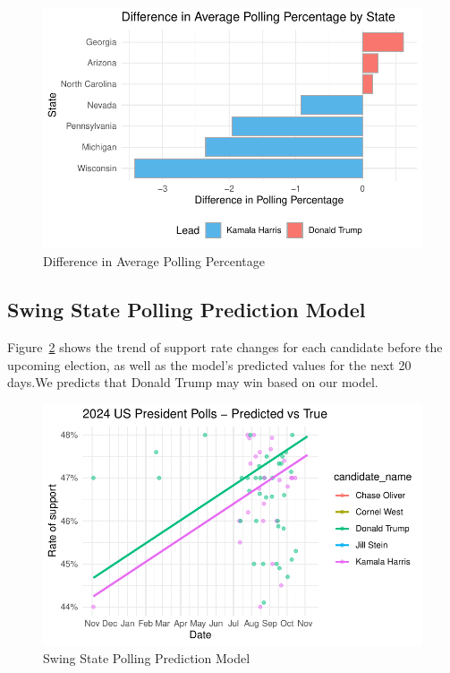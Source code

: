 \documentclass[
  letterpaper,
  DIV=11,
  numbers=noendperiod]{scrartcl}
\begin{document}
\begin{figure}

{\centering \includegraphics{paper_files/figure-pdf/fig-3-1.pdf}

}

\caption{\label{fig-3}Difference in Average Polling Percentage}

\end{figure}

\hypertarget{swing-state-polling-prediction-model}{%
\subsection{Swing State Polling Prediction
Model}\label{swing-state-polling-prediction-model}}

Figure~\ref{fig-4} shows the trend of support rate changes for each
candidate before the upcoming election, as well as the model's predicted
values for the next 20 days.We predicts that Donald Trump may win based
on our model.

\begin{figure}

{\centering \includegraphics{paper_files/figure-pdf/fig-4-1.pdf}

}

\caption{\label{fig-4}Swing State Polling Prediction Model}

\end{figure}
\end{document}
